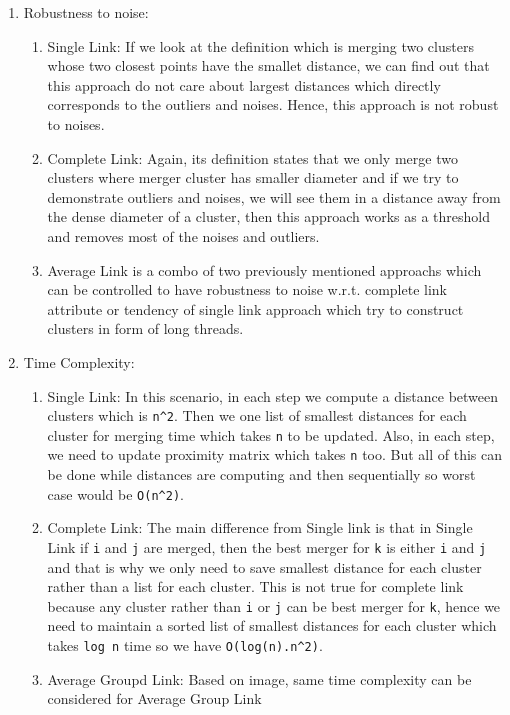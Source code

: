 \documentclass[11pt]{article}
\providecommand{\tightlist}{%
      \setlength{\itemsep}{0pt}\setlength{\parskip}{0pt}}
\begin{document}
\begin{enumerate}
\def\labelenumi{\arabic{enumi}.}
\tightlist
\item
  Robustness to noise:

  \begin{enumerate}
  \def\labelenumii{\arabic{enumii}.}
  \tightlist
  \item
    Single Link: If we look at the definition which is merging two
    clusters whose two closest points have the smallet distance, we can
    find out that this approach do not care about largest distances
    which directly corresponds to the outliers and noises. Hence, this
    approach is not robust to noises.
  \item
    Complete Link: Again, its definition states that we only merge two
    clusters where merger cluster has smaller diameter and if we try to
    demonstrate outliers and noises, we will see them in a distance away
    from the dense diameter of a cluster, then this approach works as a
    threshold and removes most of the noises and outliers.
  \item
    Average Link is a combo of two previously mentioned approachs which
    can be controlled to have robustness to noise w.r.t. complete link
    attribute or tendency of single link approach which try to construct
    clusters in form of long threads.
  \end{enumerate}
\item
  Time Complexity:

  \begin{enumerate}
  \def\labelenumii{\arabic{enumii}.}
  \tightlist
  \item
    Single Link: In this scenario, in each step we compute a distance
    between clusters which is \texttt{n\^{}2}. Then we one list of
    smallest distances for each cluster for merging time which takes
    \texttt{n} to be updated. Also, in each step, we need to update
    proximity matrix which takes \texttt{n} too. But all of this can be
    done while distances are computing and then sequentially so worst
    case would be \texttt{O(n\^{}2)}.
  \item
    Complete Link: The main difference from Single link is that in
    Single Link if \texttt{i} and \texttt{j} are merged, then the best
    merger for \texttt{k} is either \texttt{i} and \texttt{j} and that
    is why we only need to save smallest distance for each cluster
    rather than a list for each cluster. This is not true for complete
    link because any cluster rather than \texttt{i} or \texttt{j} can be
    best merger for \texttt{k}, hence we need to maintain a sorted list
    of smallest distances for each cluster which takes \texttt{log\ n}
    time so we have \texttt{O(log(n).n\^{}2)}.
  \item
    Average Groupd Link: Based on image, same time complexity can be
    considered for Average Group Link
  \end{enumerate}
\end{enumerate}
\end{document}
